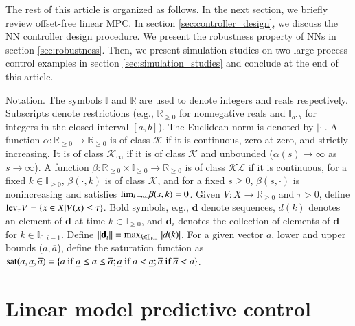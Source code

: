 \documentclass[preprint,5p, twocolumn, authoryear]{elsarticle}
\newcommand{\bbR}{\mathbb{R}}
\newcommand{\bbI}{\mathbb{I}}
\begin{document}
The rest of this article is organized as follows. 
In the next section, we briefly review 
offset-free linear MPC. 
In section \ref{sec:controller_design},
we discuss the NN 
controller design procedure.
We present the robustness property
of NNs in section \ref{sec:robustness}.
Then, we present simulation studies
on two large process control examples
in section \ref{sec:simulation_studies}
and conclude at the end of this article.

Notation. The symbols $\bbI$ and $\bbR$ are 
used to denote integers and reals respectively. 
Subscripts denote restrictions 
(e.g., $\bbR_{\geq 0}$ for nonnegative reals and 
$\bbI_{a:b}$ for integers in the 
closed interval $[a, b]$). The Euclidean norm 
is denoted by $\vert \cdot \vert$. A function 
$\alpha : \bbR_{\geq 0} \rightarrow \bbR_{\geq 0}$
is of class $\mathcal{K}$ if it is continuous, zero 
at zero, and strictly increasing. It is of class 
$\mathcal{K}_{\infty}$ if it is of class $\mathcal{K}$
and unbounded ($\alpha(s) \rightarrow \infty$ as 
$s \rightarrow \infty$). A function
$\beta : \bbR_{\geq 0} \times \bbI_{\geq 0} \rightarrow \bbR_{\geq 0}$
is of class $\mathcal{K} \mathcal{L}$ if it is continuous,
for a fixed $k \in \bbI_{\geq 0}$, $\beta(\cdot, k)$ is of class $\mathcal{K}$,
and for a fixed $s \geq 0$, $\beta(s, \cdot)$ is nonincreasing
and satisfies $\textnormal{lim}_{k \rightarrow \infty} \beta(s, k) = 0$.
Given $V : X \rightarrow \bbR_{\geq 0}$ and $\tau > 0$, define 
$\textnormal{lev}_{\tau} V = \{ x \in X | V(x) \leq \tau \}$.
Bold symbols, e.g., $\mathbf{d}$ denote sequences, 
$d(k)$ denotes an element of $\mathbf{d}$ at time 
$k \in \bbI_{\geq 0}$, and $\mathbf{d}_i$ 
denotes the collection of elements of 
$\mathbf{d}$ for $k \in \bbI_{0:i-1}$.
Define $\vert \vert \mathbf{d}_i \vert \vert = 
\textnormal{max}_{k \in \bbI_{0:i-1}} \vert d(k) \vert$.
For a given vector $a$, lower and upper bounds 
($\underline{a}, \overline{a}$), define the saturation function 
as $\textnormal{sat}(a, \underline{a}, \overline{a}) = 
\{ a \ \textnormal{if} \ \underline{a} \leq a \leq \overline{a}; 
\underline{a} \ \textnormal{if} \ a < \underline{a};
\overline{a} \ \textnormal{if} \ \overline{a} < a \}$.

\section{Linear model predictive control} \label{sec:mpc}
\end{document}
